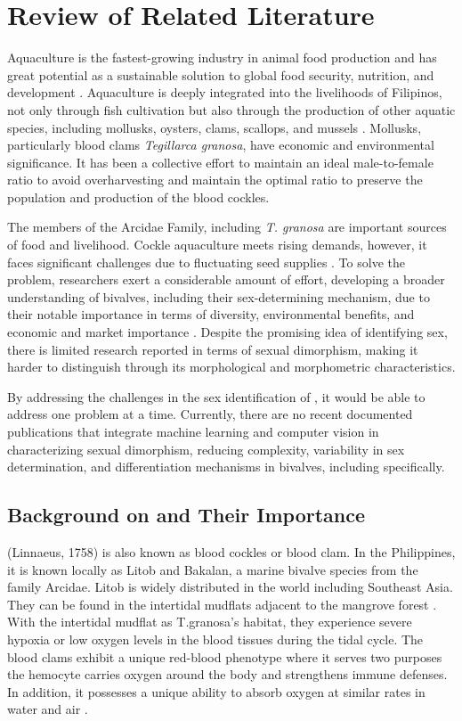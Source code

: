 \chapter{Review of Related Literature}
\label{sec:relatedlit}

Aquaculture is the fastest-growing industry in animal food production and has great potential as a sustainable solution to global food security, nutrition, and development \cite{fao2024}. Aquaculture is deeply integrated into the livelihoods of Filipinos, not only through fish cultivation but also through the production of other aquatic species, including mollusks, oysters, clams, scallops, and mussels \cite{breton2017sex}. Mollusks, particularly blood clams \textit{Tegillarca granosa}, have economic and environmental significance. It has been a collective effort to maintain an ideal male-to-female ratio to avoid overharvesting and maintain the optimal ratio to preserve the population and production of the blood cockles. 	

The members of the Arcidae Family, including \textit{T. granosa} are important sources of food and livelihood. Cockle aquaculture meets rising demands, however, it faces significant challenges due to fluctuating seed supplies \cite{miranda2023}. To solve the problem, researchers exert a considerable amount of effort, developing a broader understanding of bivalves, including their sex-determining mechanism, due to their notable importance in terms of diversity, environmental benefits, and economic and market importance \cite{breton2017sex}. Despite the promising idea of identifying sex, there is limited research reported in terms of sexual dimorphism, making it harder to distinguish through its morphological and morphometric characteristics. 

By addressing the challenges in the sex identification of \Tgranosa, it would be able to address one problem at a time. Currently, there are no recent documented publications that integrate machine learning and computer vision in characterizing sexual dimorphism, reducing complexity, variability in sex determination, and differentiation mechanisms in bivalves, including \Tgranosa specifically.

\section{Background on \Tgranosa and Their Importance}
\textit{\Tegillarcagranosa}(Linnaeus, 1758) is also known as blood cockles or blood clam. In the Philippines, it is known locally as Litob and Bakalan, a marine bivalve species from the family Arcidae. Litob is widely distributed in the world including Southeast Asia. They can be found in the intertidal mudflats adjacent to the mangrove forest \cite{srisunont2020}. With the intertidal mudflat as T.granosa's habitat, they experience severe hypoxia or low oxygen levels in the blood tissues during the tidal cycle. The blood clams exhibit a unique red-blood phenotype where it serves two purposes the hemocyte carries oxygen around the body and strengthens immune defenses. In addition,  it possesses a unique ability to absorb oxygen at similar rates in water and air \cite{zhan2022}. 

